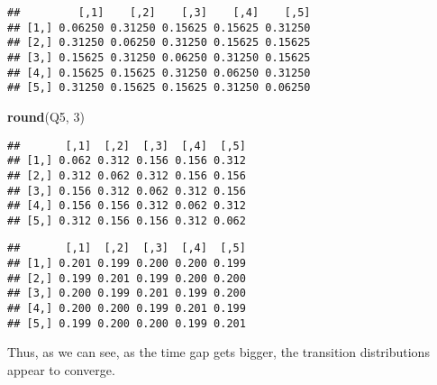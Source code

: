 \documentclass[]{book}
\newenvironment{Shaded}{\begin{snugshade}}{\end{snugshade}}
\newcommand{\KeywordTok}[1]{\textcolor[rgb]{0.13,0.29,0.53}{\textbf{#1}}}
\newcommand{\DecValTok}[1]{\textcolor[rgb]{0.00,0.00,0.81}{#1}}
\newcommand{\StringTok}[1]{\textcolor[rgb]{0.31,0.60,0.02}{#1}}
\newcommand{\CommentTok}[1]{\textcolor[rgb]{0.56,0.35,0.01}{\textit{#1}}}
\newcommand{\ControlFlowTok}[1]{\textcolor[rgb]{0.13,0.29,0.53}{\textbf{#1}}}
\newcommand{\OperatorTok}[1]{\textcolor[rgb]{0.81,0.36,0.00}{\textbf{#1}}}
\newcommand{\NormalTok}[1]{#1}
\begin{document}
\begin{verbatim}
##         [,1]    [,2]    [,3]    [,4]    [,5]
## [1,] 0.06250 0.31250 0.15625 0.15625 0.31250
## [2,] 0.31250 0.06250 0.31250 0.15625 0.15625
## [3,] 0.15625 0.31250 0.06250 0.31250 0.15625
## [4,] 0.15625 0.15625 0.31250 0.06250 0.31250
## [5,] 0.31250 0.15625 0.15625 0.31250 0.06250
\end{verbatim}

\begin{Shaded}
\begin{Highlighting}[]
\KeywordTok{round}\NormalTok{(Q5, }\DecValTok{3}\NormalTok{)}
\end{Highlighting}
\end{Shaded}

\begin{verbatim}
##       [,1]  [,2]  [,3]  [,4]  [,5]
## [1,] 0.062 0.312 0.156 0.156 0.312
## [2,] 0.312 0.062 0.312 0.156 0.156
## [3,] 0.156 0.312 0.062 0.312 0.156
## [4,] 0.156 0.156 0.312 0.062 0.312
## [5,] 0.312 0.156 0.156 0.312 0.062
\end{verbatim}

\begin{Shaded}
\end{Shaded}

\begin{verbatim}
##       [,1]  [,2]  [,3]  [,4]  [,5]
## [1,] 0.201 0.199 0.200 0.200 0.199
## [2,] 0.199 0.201 0.199 0.200 0.200
## [3,] 0.200 0.199 0.201 0.199 0.200
## [4,] 0.200 0.200 0.199 0.201 0.199
## [5,] 0.199 0.200 0.200 0.199 0.201
\end{verbatim}

Thus, as we can see, as the time gap gets bigger, the transition
distributions appear to converge.
\end{document}
